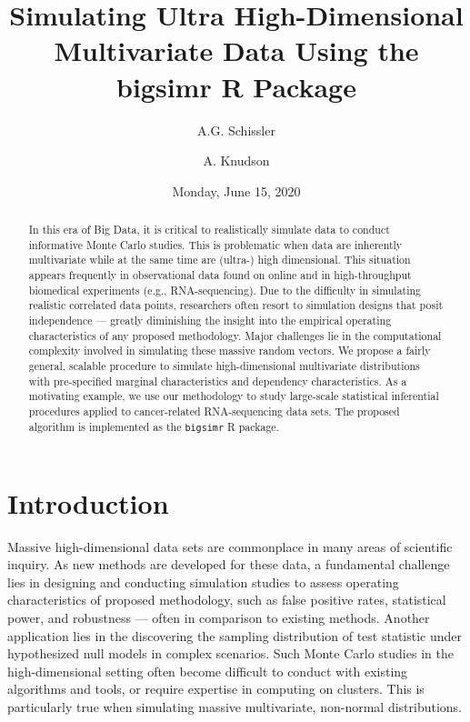 \documentclass[
]{article}
\title{Simulating Ultra High-Dimensional Multivariate Data Using the bigsimr R Package}
\author{A.G. Schissler \and A. Knudson}
\date{Monday, June 15, 2020}
\begin{document}
\maketitle
\begin{abstract}
In this era of Big Data, it is critical to realistically simulate data to conduct informative Monte Carlo studies. This is problematic when data are inherently multivariate while at the same time are (ultra-) high dimensional. This situation appears frequently in observational data found on online and in high-throughput biomedical experiments (e.g., RNA-sequencing). Due to the difficulty in simulating realistic correlated data points, researchers often resort to simulation designs that posit independence --- greatly diminishing the insight into the empirical operating characteristics of any proposed methodology. Major challenges lie in the computational complexity involved in simulating these massive random vectors. We propose a fairly general, scalable procedure to simulate high-dimensional multivariate distributions with pre-specified marginal characteristics and dependency characteristics. As a motivating example, we use our methodology to study large-scale statistical inferential procedures applied to cancer-related RNA-sequencing data sets. The proposed algorithm is implemented as the \texttt{bigsimr} R package.
\end{abstract}

{
\setcounter{tocdepth}{3}
\tableofcontents
}
\hypertarget{introduction}{%
\section{Introduction}\label{introduction}}

Massive high-dimensional data sets are commonplace in many areas of scientific inquiry. As new methods are developed for these data, a fundamental challenge lies in designing and conducting simulation studies to assess operating characteristics of proposed methodology, such as false positive rates, statistical power, and robustness --- often in comparison to existing methods. Another application lies in the discovering the sampling distribution of test statistic under hypothesized null models in complex scenarios. Such Monte Carlo studies in the high-dimensional setting often become difficult to conduct with existing algorithms and tools, or require expertise in computing on clusters. This is particularly true when simulating massive multivariate, non-normal distributions.
\end{document}
